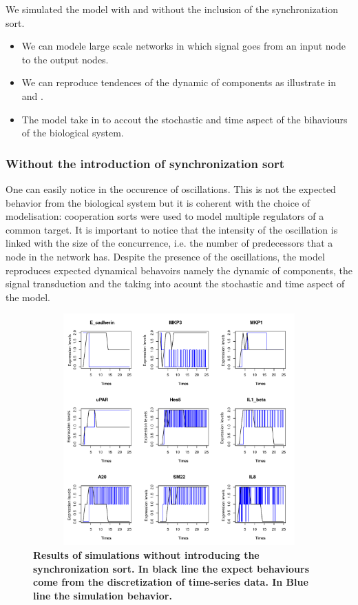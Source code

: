 We simulated the model with and without the inclusion of the synchronization sort.
\begin{itemize}
 \item We can modele large scale networks in which signal goes from an input node to the output nodes.
 \item We can reproduce tendences of the dynamic of components as illustrate in  and .
 \item The model take in to accout the stochastic and time aspect of the bihaviours of the biological system.
\end{itemize}


\subsubsection{Without the introduction of synchronization sort}
One can easily notice in  the occurence of oscillations. This is not the expected behavior from the biological system
but it is coherent with the choice of modelisation: cooperation sorts were used to model multiple regulators of a common target. 
It is important to notice that the intensity of the oscillation is linked with 
the size of the concurrence, i.e. the number of predecessors that a node in the network has.
Despite the presence of the oscillations, the model reproduces expected dynamical behavoirs  namely
the dynamic of components, the signal transduction and the taking into acount the stochastic and time aspect of the model.

\begin{figure}[!t]
\centering
\includegraphics[width=6.5in,height=3.5in]{images/resultWOS.pdf}
\caption{\bf Results of simulations without introducing the synchronization sort. In black line the expect behaviours
come from the discretization of time-series data. In Blue line the simulation behavior.}
\label{fig:rwos}
\end{figure}
